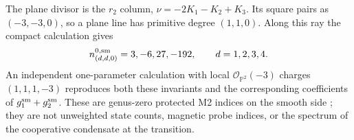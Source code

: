 The plane divisor is the $r_2$ column,
$\nu=-2K_1-K_2+K_3$. Its square pairs as $(-3,-3,0)$,
so a plane line has primitive degree $(1,1,0)$. Along this ray
the compact calculation gives
\begin{equation}
 n^{0,\rm sm}_{(d,d,0)}=3,-6,27,-192,
 \qquad d=1,2,3,4.
 \label{eq:x9-neutral-plane-gv}
\end{equation}
An independent one-parameter calculation with local
$\mathcal O_{\mathbb P^2}(-3)$ charges $(1,1,1,-3)$ reproduces
both these invariants and the corresponding coefficients of
$g^{\rm sm}_1+g^{\rm sm}_2$. These are genus-zero protected
M2 indices on the smooth side \cite{Gopakumar:1998BPS}; they are
not unweighted state counts, magnetic probe indices, or the
spectrum of the cooperative condensate at the transition.
